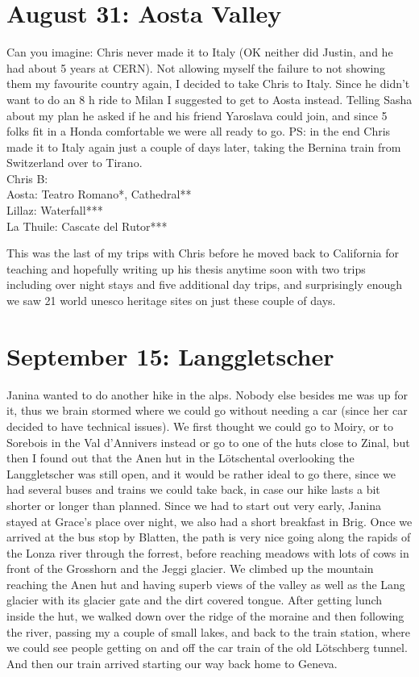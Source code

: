 \section{August 31: Aosta Valley}
\label{2019:Aosta}

Can you imagine: Chris never made it to Italy (OK neither did Justin, and he had about 5 years at CERN). Not allowing myself the failure to not showing them my favourite country again, I decided to take Chris to Italy. Since he didn't want to do an 8 h ride to Milan I suggested to get to Aosta instead. Telling Sasha about my plan he asked if he and his friend Yaroslava could join, and since 5 folks fit in a Honda comfortable we were all ready to go. PS: in the end Chris made it to Italy again just a couple of days later, taking the Bernina train from Switzerland over to Tirano.\\

Chris B:  \\

Aosta: Teatro Romano*, Cathedral**\\
Lillaz: Waterfall***\\
La Thuile: Cascate del Rutor***

This was the last of my trips with Chris before he moved back to California for teaching and hopefully writing up his thesis anytime soon with two trips including over night stays and five additional day trips, and surprisingly enough we saw 21 world unesco heritage sites on just these couple of days.\\

\section{September 15: Langgletscher}
\label{2019Langgletscher}

Janina wanted to do another hike in the alps. Nobody else besides me was up for it, thus we brain stormed where we could go without needing a car (since her car decided to have technical issues). We first thought we could go to Moiry, or to Sorebois in the Val d'Annivers instead or go to one of the huts close to Zinal, but then I found out that the Anen hut in the L\"otschental overlooking the Langgletscher was still open, and it would be rather ideal to go there, since we had several buses and trains we could take back, in case our hike lasts a bit shorter or longer than planned. Since we had to start out very early, Janina stayed at Grace's place over night, we also had a short breakfast in Brig. Once we arrived at the bus stop by Blatten, the path is very nice going along the rapids of the Lonza river through the forrest, before reaching meadows with lots of cows in front of the Grosshorn and the Jeggi glacier. We climbed up the mountain reaching the Anen hut and having superb views of the valley as well as the Lang glacier with its glacier gate and the dirt covered tongue. After getting lunch inside the hut, we walked down over the ridge of the moraine and then following the river, passing my a couple of small lakes, and back to the train station, where we could see people getting on and off the car train of the old L\"otschberg tunnel. And then our train arrived starting our way back home to Geneva.\\

